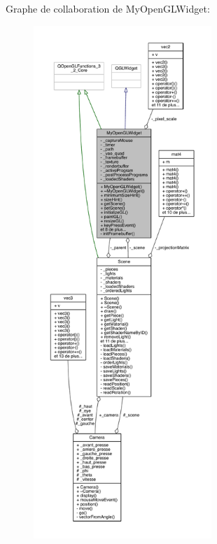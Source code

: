 Graphe de collaboration de My\+Open\+G\+L\+Widget\+:
\nopagebreak
\begin{figure}[H]
\begin{center}
\leavevmode
\includegraphics[height=550pt]{class_my_open_g_l_widget__coll__graph}
\end{center}
\end{figure}
